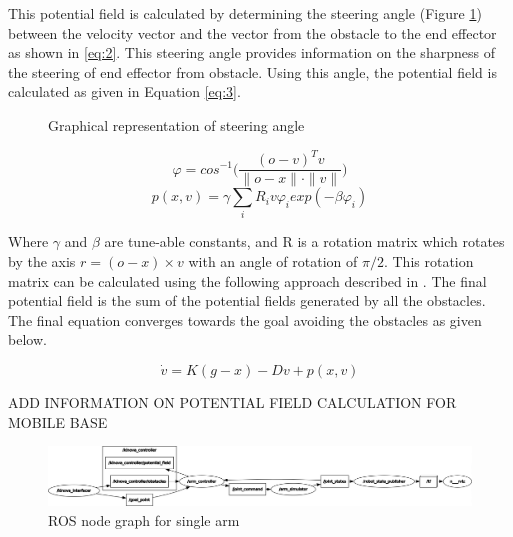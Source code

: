 \documentclass[a4paper, 11.5pt, conference]{ieeeconf}      %
\begin{document}
This potential field is calculated by determining the steering angle (Figure \ref{steering_image}) between the velocity vector and the vector from the obstacle to the end effector as shown in \ref{eq:2}. This steering angle provides information on the sharpness of the steering of end effector from obstacle. Using this angle, the potential field is calculated as given in Equation \ref{eq:3}.

\begin{figure}[H]
	\centering
	\caption{Graphical representation of steering angle \cite{Hoffmann}}
	\label{steering_image}
\end{figure}

\begin{equation} \label{eq:2}
	\varphi = cos^{-1}\Bigg( \frac{(o-v)^T v}{\|o-x\| \cdot \|v\|}\Bigg)
\end{equation}
\begin{equation} \label{eq:3}
	p(x, v) = \gamma \sum_i R_i v \varphi_i exp(-\beta \varphi_i) 
\end{equation}

Where $\gamma$ and $\beta$ are tune-able constants, and R is a rotation matrix which rotates by the axis $r = (o-x) \times v $ with an angle of rotation of $\pi/2$. This rotation matrix can be calculated using the following approach described in \cite{rodrigues}. The final potential field is the sum of the potential fields generated by all the obstacles. The final equation converges towards the goal avoiding the obstacles as given below.

\begin{equation}
\dot{v} = K ( g - x ) - D v + p(x, v)
\end{equation}

ADD INFORMATION ON POTENTIAL FIELD CALCULATION FOR MOBILE BASE

\begin{figure}[t]
	\centering
	\includegraphics[scale=0.25]{images/rosgraph_single.png}
	\caption{ROS node graph for single arm}
	\label{fig:rosgraph_single}
\end{figure}
\end{document}
